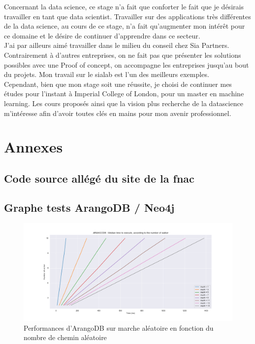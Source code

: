 \documentclass{article} %
\begin{document}
Concernant la data science, ce stage n’a fait que conforter le fait que je
désirais travailler en tant que data scientist. Travailler sur des applications très
différentes de la data science, au cours de ce stage, n’a fait qu’augmenter mon intérêt
pour ce domaine et le désire de continuer d’apprendre dans ce secteur.\\

J'ai par ailleurs aimé travailler dans le milieu du conseil chez Sia Partners. Contrairement à d'autres entreprises, on ne fait pas que présenter les solutions possibles avec une Proof of concept, on accompagne les entreprises jusqu'au bout du projets. Mon travail sur le sialab est l'un des meilleurs exemples.\\

Cependant, bien que mon stage soit une réussite, je choisi de continuer mes études pour l'instant à Imperial College of London, pour un master en machine learning. Les cours proposés ainsi que la vision plus recherche de la datascience m'intéresse afin d'avoir toutes clés en mains pour mon avenir professionnel.


\newpage

\section{Annexes}
\subsection{Code source allégé du site de la fnac}
%
\newpage
\subsection{Graphe tests ArangoDB / Neo4j}

\begin{figure}[!h]
	\centering
	\includegraphics[keepaspectratio = true,scale=0.4]{arangoDB_nbwalker_time.png}
	\caption{Performances d'ArangoDB sur marche aléatoire en fonction du nombre de chemin aléatoire}
	\label{fig:arwalk}
\end{figure}
\end{document}

